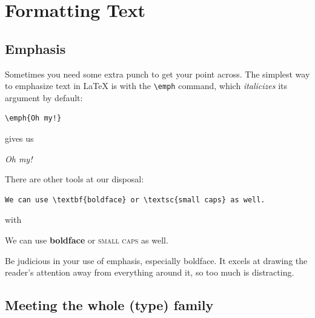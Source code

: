 \chapter{Formatting Text}
\label{formatting}

\section{Emphasis}

Sometimes you need some extra punch to get your point across.
The simplest way to emphasize text in \LaTeX{} is with the \verb|\emph| command,
which \emph{italicizes} its argument by default:
\begin{leftfigure}
\begin{lstlisting}
\emph{Oh my!}
\end{lstlisting}
\end{leftfigure}
gives us
\begin{leftfigure}
\lm \emph{Oh my!}
\end{leftfigure}
There are other tools at our disposal:
\begin{leftfigure}
\begin{lstlisting}
We can use \textbf{boldface} or \textsc{small caps} as well.
\end{lstlisting}
\end{leftfigure}
with
\begin{leftfigure}
\lm%
We can use \textbf{boldface} or \textsc{small caps} as well.
\end{leftfigure}
Be judicious in your use of emphasis, especially boldface.
It excels at drawing the reader's attention away from everything around it,
so too much is distracting.

\section{Meeting the whole (type) family}

